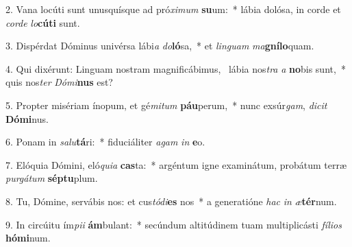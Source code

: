 2. Vana locúti sunt unusquísque ad pró\textit{xi}\textit{mum} \textbf{su}um:~*  lábia dolósa, in corde et \textit{cor}\textit{de} \textit{lo}\textbf{cú}\textbf{ti} sunt.\

3. Dispérdat Dóminus univérsa lábi\textit{a} \textit{do}\textbf{ló}sa,~*  et \textit{lin}\textit{guam} \textit{ma}\textbf{gní}\textbf{lo}quam.\

4. Qui dixérunt: Linguam nostram magnificábimus, \dag\  lábia nos\textit{tra} \textit{a} \textbf{no}bis sunt,~*  quis nos\textit{ter} \textit{Dó}\textit{mi}\textbf{nus} est?\

5. Propter misériam ínopum, et gé\textit{mi}\textit{tum} \textbf{páu}perum,~*  nunc exsúr\textit{gam}, \textit{di}\textit{cit} \textbf{Dó}\textbf{mi}nus.\

6. Ponam in \textit{sa}\textit{lu}\textbf{tá}ri:~*  fiduciáliter \textit{a}\textit{gam} \textit{in} \textbf{e}o.\

7. Elóquia Dómini, eló\textit{qui}\textit{a} \textbf{cas}ta:~*  argéntum igne examinátum, probátum terræ \textit{pur}\textit{gá}\textit{tum} \textbf{sép}\textbf{tu}plum.\

8. Tu, Dómine, servábis nos: et cus\textit{tó}\textit{di}\textbf{es} nos~*  a generatióne \textit{hac} \textit{in} \textit{æ}\textbf{tér}num.\

9. In circúitu ím\textit{pi}\textit{i} \textbf{ám}bulant:~*  secúndum altitúdinem tuam multiplicásti \textit{fí}\textit{li}\textit{os} \textbf{hó}\textbf{mi}num.\

